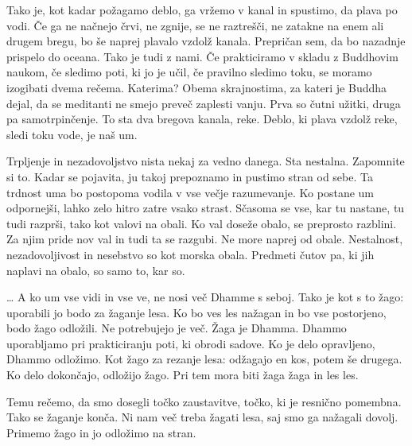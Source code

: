 \clearpage

\enlargethispage{2\baselineskip}


Tako je, kot kadar požagamo deblo, ga vržemo v kanal in spustimo, da plava po vodi. Če ga ne načnejo črvi, ne zgnije, se ne raztrešči, ne zatakne na enem ali drugem bregu, bo še naprej plavalo vzdolž kanala. Prepričan sem, da bo nazadnje prispelo do oceana.
Tako je tudi z nami. Če prakticiramo v skladu z Buddhovim naukom, če sledimo poti, ki jo je učil, če pravilno sledimo toku, se moramo izogibati dvema rečema. Katerima? Obema skrajnostima, za kateri je Buddha dejal, da se meditanti ne smejo preveč zaplesti vanju. Prva so čutni užitki, druga pa samotrpinčenje. To sta dva bregova kanala, reke. Deblo, ki plava vzdolž reke, sledi toku vode, je naš um.

\vspace{-\baselineskip}

Trpljenje in nezadovoljstvo nista nekaj za vedno danega. Sta nestalna. Zapomnite si to. Kadar se pojavita, ju takoj prepoznamo in pustimo stran od sebe. Ta trdnost uma bo postopoma vodila v vse večje razumevanje. Ko postane um odpornejši, lahko zelo hitro zatre vsako strast. Sčasoma se vse, kar tu nastane, tu tudi razprši, tako kot valovi na obali. Ko val doseže obalo, se preprosto razblini. Za njim pride nov val in tudi ta se razgubi. Ne more naprej od obale. Nestalnost, nezadovoljivost in nesebstvo so kot morska obala. Predmeti čutov pa, ki jih naplavi na obalo, so samo to, kar so.

\clearpage


\ldots{} A ko um vse vidi in vse ve, ne nosi več Dhamme s seboj. Tako je kot s to žago: uporabili jo bodo za žaganje lesa. Ko bo ves les nažagan in bo vse postorjeno, bodo žago odložili. Ne potrebujejo je več. Žaga je Dhamma. Dhammo uporabljamo pri prakticiranju poti, ki obrodi sadove. Ko je delo opravljeno, Dhammo odložimo. Kot žago za rezanje lesa: odžagajo en kos, potem še drugega. Ko delo dokončajo, odložijo žago. Pri tem mora biti žaga žaga in les les.

Temu rečemo, da smo dosegli točko zaustavitve, točko, ki je resnično pomembna. Tako se žaganje konča. Ni nam več treba žagati lesa, saj smo ga nažagali dovolj. Primemo žago in jo odložimo na stran.



